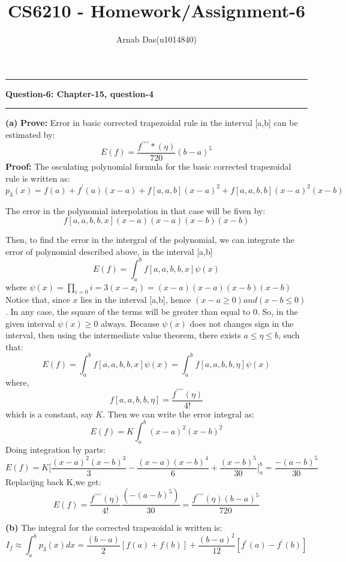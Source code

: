 \documentclass{article}
\title{CS6210 - Homework/Assignment-6}
\author{Arnab Das(u1014840)}
\newcommand\question[2]{\vspace{.25in}\hrule\textbf{#1: #2}\hrule\vspace{.10in}}
\renewcommand\part[1]{\vspace{.10in}\textbf{(#1)}}
\begin{document}
  \maketitle
  \newpage
  \newcommand\NAME{ARNAB DAS}
  \newcommand\UID{uxxxxxxx}
  \newcommand\HWNUM{4}

  \question{Question-6}{Chapter-15, question-4}
  \part{a} \textbf {Prove:} Error in basic corrected trapezoidal rule in the interval [a,b] can be estimated by:
  \[E(f) = \dfrac{f^{\prime\prime\prime\prime}*(\eta)}{720} (b-a)^5\]
  \textbf {Proof:} The osculating polynomial formula for the basic corrected trapezoidal rule is written as:
  \[p_3(x) = f(a) + f^\prime(a)(x-a) + f[a,a,b](x-a)^2 + f[a,a,b,b](x-a)^2(x-b)\]

  The error in the polynomial interpolation in that case will be fiven by:
  \[f[a,a,b,b,x](x-a)(x-a)(x-b)(x-b)\]

  Then, to find the error in the intergral of the polynomial, we can integrate the error of polynomial described above, in the interval [a,b]
  \[E(f) = \int_{a}^{b} f[a,a,b,b,x]\psi(x)\]
  where $\psi(x) = \prod_{i=0}{i=3}(x - x_i) = (x-a)(x-a)(x-b)(x-b)$ \newline
  Notice that, since $x$ lies in the interval [a,b], hence $(x-a \geq 0) and (x-b \leq 0)$. In any case, the square of the terms will be greater than equal to 0. So, in the given interval $\psi(x) \geq 0$ always. Because $\psi(x)$ does not changes sign in the interval, then using the intermediate value theorem, there exists $a \leq \eta \leq b$, such that:
  \[E(f) = \int_{a}^{b} f[a,a,b,b,x]\psi(x) = \int_{a}^{b} f[a,a,b,b,\eta]\psi(x)\]
  where,
  \[f[a,a,b,b,\eta] = \dfrac{f^{\prime\prime\prime\prime}(\eta)}{4!}\]
  which is a constant, say $K$. \newline
  Then we can write the error integral as:
  \[E(f) = K \int_{a}^{b} (x-a)^2(x-b)^2 \]
  Doing integration by parts:
  \[E(f) = K\bigg [ \dfrac{(x-a)^2(x-b)^3}{3} - \dfrac{(x-a)(x-b)^4}{6} + \dfrac{(x - b)^5}{30}    \bigg ]_{a}^{b} = \dfrac{-(a-b)^5}{30}\]
  Replacijng back K,we get:
  \[E(f) = \dfrac{f^{\prime\prime\prime\prime}(\eta)}{4!}\dfrac{(-(a-b)^5)}{30} = \dfrac{f^{\prime\prime\prime\prime}(\eta)(b-a)^5}{720} \]

  \part{b} The integral for the corrected trapezoidal is written is:
  \[ I_f \approx \int_{a}^{b} p_3(x)dx = \dfrac{(b-a)}{2}[f(a) + f(b)] + \dfrac{(b-a)^2}{12}[f^\prime(a) - f^\prime(b)] \]
\end{document}
